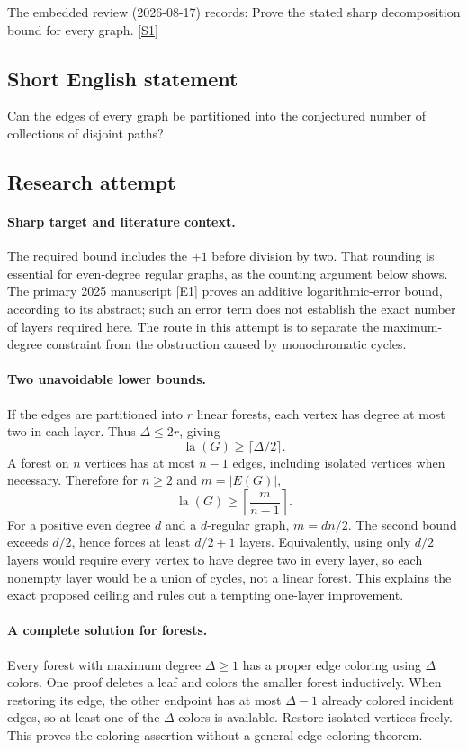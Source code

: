 \documentclass[11pt,a4paper]{article}
\newcommand{\sref}[2]{\hyperlink{source:#1:#2}{[S#2]}}
\begin{document}
The embedded review (2026-08-17) records: Prove the stated sharp decomposition bound for every graph. \sref{statement}{1}

\subsection{Short English statement}

Can the edges of every graph be partitioned into the conjectured number of collections of disjoint paths?

\subsection{Research attempt}

\paragraph{Sharp target and literature context.}
The required bound includes the $+1$ before division by two. That
rounding is essential for even-degree regular graphs, as the counting
argument below shows. The primary 2025 manuscript [E1] proves an
additive logarithmic-error bound, according to its abstract; such an
error term does not establish the exact number of layers required here.
The route in this attempt is to separate the maximum-degree constraint
from the obstruction caused by monochromatic cycles.

\paragraph{Two unavoidable lower bounds.}
If the edges are partitioned into $r$ linear forests, each vertex has
degree at most two in each layer. Thus $\Delta\le2r$, giving
\[
                  \operatorname{la}(G)\ge\lceil\Delta/2\rceil.
\]
A forest on $n$ vertices has at most $n-1$ edges, including isolated
vertices when necessary. Therefore for $n\ge2$ and $m=|E(G)|$,
\[
                  \operatorname{la}(G)\ge\left\lceil\frac m{n-1}\right\rceil.
\]
For a positive even degree $d$ and a $d$-regular graph, $m=dn/2$.
The second bound exceeds $d/2$, hence forces at least $d/2+1$
layers. Equivalently, using only $d/2$ layers would require every
vertex to have degree two in every layer, so each nonempty layer
would be a union of cycles, not a linear forest. This explains the
exact proposed ceiling and rules out a tempting one-layer improvement.

\paragraph{A complete solution for forests.}
Every forest with maximum degree $\Delta\ge1$ has a proper edge
coloring using $\Delta$ colors. One proof deletes a leaf and colors
the smaller forest inductively. When restoring its edge, the other
endpoint has at most $\Delta-1$ already colored incident edges, so
at least one of the $\Delta$ colors is available. Restore isolated
vertices freely. This proves the coloring assertion without a general
edge-coloring theorem.
\end{document}
